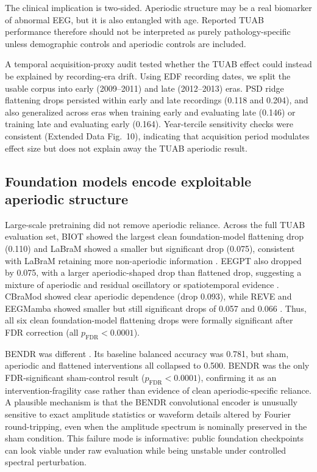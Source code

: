 \documentclass[pdflatex,sn-nature]{sn-jnl}
\begin{document}
The clinical implication is two-sided. Aperiodic structure may be a real biomarker of abnormal EEG, but it is also entangled with age. Reported TUAB performance therefore should not be interpreted as purely pathology-specific unless demographic controls and aperiodic controls are included.

A temporal acquisition-proxy audit tested whether the TUAB effect could instead be explained by recording-era drift. Using EDF recording dates, we split the usable corpus into early (2009--2011) and late (2012--2013) eras. PSD ridge flattening drops persisted within early and late recordings (0.118 and 0.204), and also generalized across eras when training early and evaluating late (0.146) or training late and evaluating early (0.164). Year-tercile sensitivity checks were consistent (Extended Data Fig.~10), indicating that acquisition period modulates effect size but does not explain away the TUAB aperiodic result.

\subsection{Foundation models encode exploitable aperiodic structure}

Large-scale pretraining did not remove aperiodic reliance. Across the full TUAB evaluation set, BIOT showed the largest clean foundation-model flattening drop (0.110) and LaBraM showed a smaller but significant drop (0.075), consistent with LaBraM retaining more non-aperiodic information \cite{yang2023biot,jiang2024labram}. EEGPT also dropped by 0.075, with a larger aperiodic-shaped drop than flattened drop, suggesting a mixture of aperiodic and residual oscillatory or spatiotemporal evidence \cite{yue2024eegpt}. CBraMod showed clear aperiodic dependence (drop 0.093), while REVE and EEGMamba showed smaller but still significant drops of 0.057 and 0.066 \cite{wang2025cbramod,elouahidi2025reve,wang2025eegmamba}. Thus, all six clean foundation-model flattening drops were formally significant after FDR correction (all $p_{\mathrm{FDR}}<0.0001$).

BENDR was different \cite{kostas2021bendr}. Its baseline balanced accuracy was 0.781, but sham, aperiodic and flattened interventions all collapsed to 0.500. BENDR was the only FDR-significant sham-control result ($p_{\mathrm{FDR}}<0.0001$), confirming it as an intervention-fragility case rather than evidence of clean aperiodic-specific reliance. A plausible mechanism is that the BENDR convolutional encoder is unusually sensitive to exact amplitude statistics or waveform details altered by Fourier round-tripping, even when the amplitude spectrum is nominally preserved in the sham condition. This failure mode is informative: public foundation checkpoints can look viable under raw evaluation while being unstable under controlled spectral perturbation.
\end{document}
